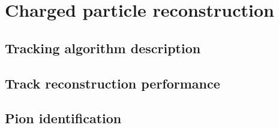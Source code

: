 \chapter{Charged particle reconstruction}
\label{ch:reconstruction}

\section{Tracking algorithm description}
\section{Track reconstruction performance}
\section{Pion identification}


